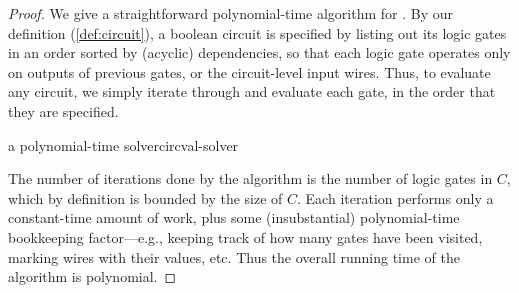 \begin{proof}

  We give a straightforward polynomial-time algorithm for .  By our definition (\cref{def:circuit}), a boolean circuit is
  specified by listing out its logic gates in an order sorted by (acyclic)
  dependencies, so that each logic gate operates only on outputs of previous
  gates, or the circuit-level input wires.  Thus, to evaluate any circuit, we
  simply iterate through and evaluate each gate, in the order that they are
  specified.


  \begin{algorithm}{a polynomial-time \CircVal{} solver}{circval-solver}
    \begin{algorithmic}
      \EndIf
      \EndFor
    \end{algorithmic}
  \end{algorithm}

  The number of iterations done by the algorithm is the number of logic gates in
  \(C\), which by definition is bounded by the size of \(C\).  Each iteration
  performs only a constant-time amount of work, plus some (insubstantial)
  polynomial-time bookkeeping factor—e.g., keeping track of how many gates have
  been visited, marking wires with their values, etc.  Thus the overall running
  time of the algorithm is polynomial.  \qedhere


\end{proof}
